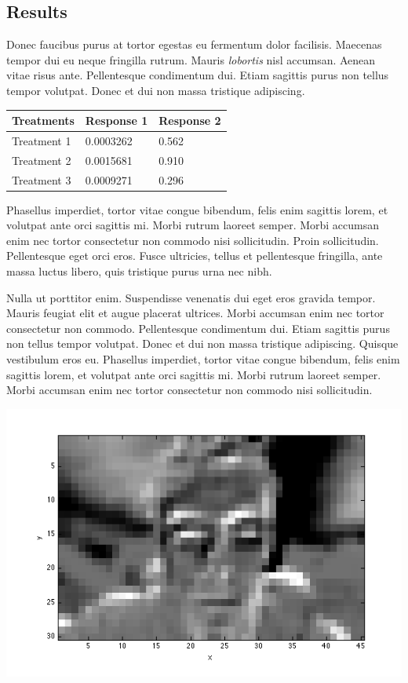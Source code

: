 \documentclass[a0,landscape]{a0poster}
\begin{document}
\begin{multicols}{4}
\section*{Results}

Donec faucibus purus at tortor egestas eu fermentum dolor facilisis. Maecenas tempor dui eu neque fringilla rutrum. Mauris \emph{lobortis} nisl accumsan. Aenean vitae risus ante. Pellentesque condimentum dui. Etiam sagittis purus non tellus tempor volutpat. Donec et dui non massa tristique adipiscing.
%
\begin{table} %
\begin{tabular}{l l l}
\toprule
\textbf{Treatments} & \textbf{Response 1} & \textbf{Response 2}\\
\midrule
Treatment 1 & 0.0003262 & 0.562 \\
Treatment 2 & 0.0015681 & 0.910 \\
Treatment 3 & 0.0009271 & 0.296 \\
\bottomrule
\end{tabular}
\end{table}
%
Phasellus imperdiet, tortor vitae congue bibendum, felis enim sagittis lorem, et volutpat ante orci sagittis mi. Morbi rutrum laoreet semper. Morbi accumsan enim nec tortor consectetur non commodo nisi sollicitudin. Proin sollicitudin. Pellentesque eget orci eros. Fusce ultricies, tellus et pellentesque fringilla, ante massa luctus libero, quis tristique purus urna nec nibh.

Nulla ut porttitor enim. Suspendisse venenatis dui eget eros gravida tempor. Mauris feugiat elit et augue placerat ultrices. Morbi accumsan enim nec tortor consectetur non commodo. Pellentesque condimentum dui. Etiam sagittis purus non tellus tempor volutpat. Donec et dui non massa tristique adipiscing. Quisque vestibulum eros eu. Phasellus imperdiet, tortor vitae congue bibendum, felis enim sagittis lorem, et volutpat ante orci sagittis mi. Morbi rutrum laoreet semper. Morbi accumsan enim nec tortor consectetur non commodo nisi sollicitudin.

\begin{center}\vspace{1cm}
\includegraphics[width=0.8\linewidth]{images/red_trough.png}
\end{center}\vspace{1cm}


\end{multicols}
\end{document}
